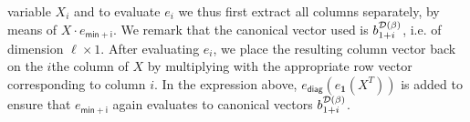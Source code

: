 variable $X_i$ and to evaluate $e_i$ we thus first extract all columns separately, by means of $X\cdot e_{\mathsf{min}+\mathsf{i}}$.
We remark that the canonical vector used is $b_{1+i}^{\mathcal{D}(\beta)}$, i.e. of dimension $\ell\times 1$.
After evaluating $e_i$, we place the resulting column vector back on the $i$the column of $X$ by multiplying with the appropriate
row vector corresponding to column $i$. In the expression above, $e_{\mathsf{diag}}(e_{\mathbf{1}}(X^T))$ is added to ensure that
$e_{\mathsf{min} + \mathsf{i}}$ again evaluates to canonical vectors $b_{1+i}^{\mathcal{D}(\beta)}$.
%
